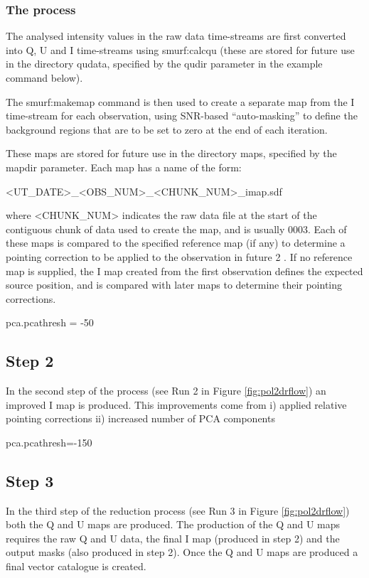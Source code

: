 \subsubsection*{The process}
The  analysed  intensity values in the raw data time-streams are first converted into Q, U and I time-streams
using smurf:calcqu (these are stored for future use in the directory qudata, specified by the qudir parameter in the example command below). 

The smurf:makemap command is then used to create a separate map from the I time-stream for each observation, using SNR-based “auto-masking” to define the background regions that are to be set to zero at the end of each iteration.  

These maps are stored for future use in the directory maps, specified by the mapdir parameter. Each map has a name of the form:

<UT_DATE>_<OBS_NUM>_<CHUNK_NUM>_imap.sdf

where <CHUNK_NUM> indicates the raw data file at the start of the contiguous chunk of data used to create the map, and is
usually 0003. Each of these maps is compared to the specified reference map (if any) to determine a pointing correction to be applied to the observation in future
2 . If no reference map is supplied, the I map created from the first observation defines the expected source position, and is compared with later maps to determine their pointing corrections.

pca.pcathresh = -50



\subsection*{Step 2}

In the second step of the process (see Run 2 in Figure \ref{fig:pol2drflow}) an improved I map is produced. This improvements come from i) applied relative pointing corrections ii) increased number of PCA components

pca.pcathresh=-150


\subsection*{Step 3}

In the third step of the reduction process (see Run 3 in Figure \ref{fig:pol2drflow}) both the Q and U maps are produced. The production of the Q and U maps requires the raw Q and U data, the final I map (produced in step 2) and the output masks (also produced in step 2). Once the Q and U maps are produced a final vector catalogue is created.

